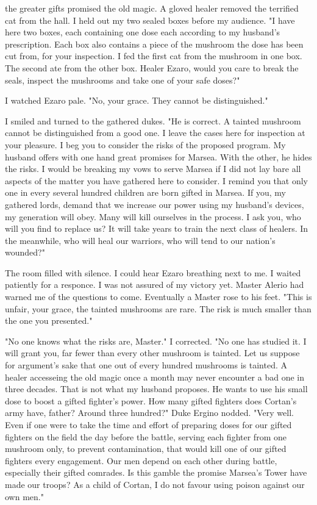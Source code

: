 \documentclass{article}
\begin{document}
the greater gifts promised the old magic. A gloved healer removed the terrified cat from the hall. I held out my two sealed boxes before my audience. "I have here two boxes, each containing one dose each according to my husband's prescription. Each box also contains a piece of the mushroom the dose has been cut from, for your inspection. I fed the first cat from the mushroom in one box. The second ate from the other box. Healer Ezaro, would you care to break the seals, inspect the mushrooms and take one of your safe doses?"

I watched Ezaro pale. "No, your grace. They cannot be distinguished."

I smiled and turned to the gathered dukes. "He is correct. A tainted mushroom cannot be distinguished from a good one. I leave the cases here for inspection at your pleasure. I beg you to consider the risks of the proposed program. My husband offers with one hand great promises for Marsea. With the other, he hides the risks. I would be breaking my vows to serve Marsea if I did not lay bare all aspects of the matter you have gathered here to consider. I remind you that only one in every several hundred children are born gifted in Marsea. If you, my gathered lords, demand that we increase our power using my husband's devices, my generation will obey. Many will kill ourselves in the process. I ask you, who will you find to replace us? It will take years to train the next class of healers. In the meanwhile, who will heal our warriors, who will tend to our nation's wounded?"

The room filled with silence. I could hear Ezaro breathing next to me. I waited patiently for a responce. I was not assured of my victory yet. Master Alerio had warned me of the questions to come. Eventually a Master rose to his feet. "This is unfair, your grace, the tainted mushrooms are rare. The risk is much smaller than the one you presented." 

"No one knows what the risks are, Master." I corrected. "No one has studied it. I will grant you, far fewer than every other mushroom is tainted. Let us suppose for argument's sake that one out of every hundred mushrooms is tainted. A healer accesseing the old magic once a month may never encounter a bad one in three decades. That is not what my husband proposes. He wants to use his small dose to boost a gifted fighter's power. How many gifted fighters does Cortan's army have, father? Around three hundred?" Duke Ergino nodded.  "Very well. Even if one were to take the time and effort of preparing doses for our gifted fighters on the field the day before the battle, serving each fighter from one mushroom only, to prevent contamination, that would kill one of our gifted fighters every engagement. Our men depend on each other during battle, especially their gifted comrades. Is this gamble the promise Marsea's Tower have made our troops? As a child of Cortan, I do not favour using poison against our own men."
\end{document}
